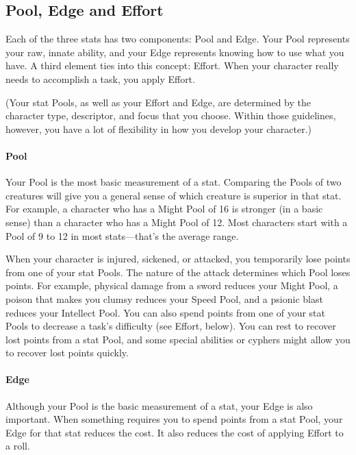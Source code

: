 \begin{multicols}{2}
\subsection{Pool, Edge and Effort}

Each of the three stats has two components: Pool and Edge. Your Pool represents your raw, innate ability, and your Edge represents knowing how to use what you have. A third element ties into this concept: Effort. When your character really needs to accomplish a task, you apply Effort.

(Your stat Pools, as well as your Effort and Edge, are determined by the character type, descriptor, and focus that you choose. Within those guidelines, however, you have a lot of flexibility in how you develop your character.)

\paragraph{Pool}

Your Pool is the most basic measurement of a stat. Comparing the Pools of two creatures will give you a general sense of which creature is superior in that stat. For example, a character who has a Might Pool of 16 is stronger (in a basic sense) than a character who has a Might Pool of 12. Most characters start with a Pool of 9 to 12 in most stats—that’s the average range.

When your character is injured, sickened, or attacked, you temporarily lose points from one of your stat Pools. The nature of the attack determines which Pool loses points. For example, physical damage from a sword reduces your Might Pool, a poison that makes you clumsy reduces your Speed Pool, and a psionic blast reduces your Intellect Pool. You can also spend points from one of your stat Pools to decrease a task’s difficulty (see Effort, below). You can rest to recover lost points from a stat Pool, and some special abilities or cyphers might allow you to recover lost points quickly.

\paragraph{Edge}

Although your Pool is the basic measurement of a stat, your Edge is also important. When something requires you to spend points from a stat Pool, your Edge for that stat reduces the cost. It also reduces the cost of applying Effort to a roll.


\end{multicols}
